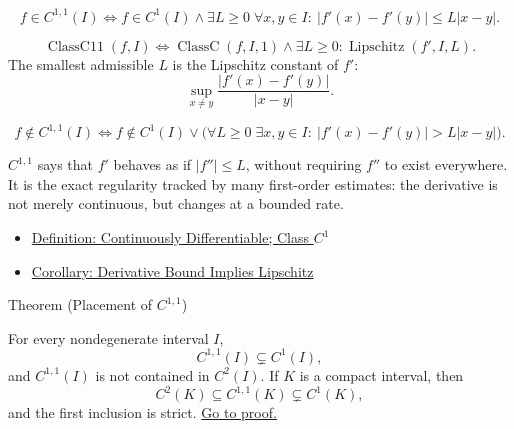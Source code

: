 \begin{remark*}
\[
  f\in C^{1,1}(I)
  \Longleftrightarrow
  f\in C^1(I)\land
  \exists L\geq 0\;\forall x,y\in I:\ |f'(x)-f'(y)|\leq L|x-y|.
\]
\end{remark*}

\begin{remark*}
\[
  \operatorname{ClassC11}(f,I)
  \Longleftrightarrow
  \operatorname{ClassC}(f,I,1)\land
  \exists L\geq0:\operatorname{Lipschitz}(f',I,L).
\]
The smallest admissible \(L\) is the Lipschitz constant of \(f'\):
\[
  \sup_{x\neq y}\frac{|f'(x)-f'(y)|}{|x-y|}.
\]
\end{remark*}

\begin{remark*}
\[
  f\notin C^{1,1}(I)
  \Longleftrightarrow
  f\notin C^1(I)\vee
  \bigl(\forall L\geq0\;\exists x,y\in I:\ |f'(x)-f'(y)|>L|x-y|\bigr).
\]
\end{remark*}

\begin{remark*}[Interpretation]
\(C^{1,1}\) says that \(f'\) behaves as if \(|f''|\leq L\), without requiring
\(f''\) to exist everywhere. It is the exact regularity tracked by many
first-order estimates: the derivative is not merely continuous, but changes
at a bounded rate.
\end{remark*}

\begin{dependencies}
\begin{itemize}
  \item \hyperref[def:class-c1]{Definition: Continuously Differentiable; Class \(C^1\)}
  \item \hyperref[cor:derivative-bound-implies-lipschitz]{Corollary: Derivative Bound Implies Lipschitz}
\end{itemize}
\end{dependencies}

\begin{theorembox}{Theorem (Placement of \(C^{1,1}\))}
\begin{theorem}[Placement of \(C^{1,1}\)]
\label{thm:c11-placement}
For every nondegenerate interval \(I\),
\[
  C^{1,1}(I)\subsetneq C^1(I),
\]
and \(C^{1,1}(I)\) is not contained in \(C^2(I)\). If \(K\) is a compact
interval, then
\[
  C^2(K)\subseteq C^{1,1}(K)\subsetneq C^1(K),
\]
and the first inclusion is strict.
\hyperref[prf:c11-placement]{Go to proof.}
\end{theorem}
\end{theorembox}

